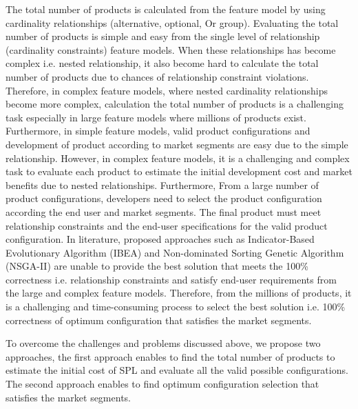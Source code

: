 The total number of products is calculated from the feature model by using cardinality relationships (alternative, optional, Or group). Evaluating the total number of products is simple and easy from the single level of relationship (cardinality constraints) feature models. When these relationships has become complex i.e. nested relationship, it also become hard to calculate the total number of products due to chances of relationship constraint violations. Therefore, in complex feature models, where nested cardinality relationships become more complex, calculation the total number of products is a challenging task especially in large feature models where millions of products exist. Furthermore, in simple feature models, valid product configurations and development of product according to market segments are easy due to the simple relationship. However, in complex feature models, it is a challenging and complex task to evaluate each product to estimate the initial development cost and market benefits due to nested relationships. Furthermore, From a large number of product configurations, developers need to select the product configuration according the end user and market segments. The final product must meet relationship constraints and the end-user specifications for the valid product configuration. In literature, proposed approaches such as Indicator-Based Evolutionary Algorithm (IBEA) \cite{t38} and Non-dominated Sorting Genetic Algorithm (NSGA-II) are unable to provide the best solution that meets the 100\% correctness i.e. relationship constraints and satisfy end-user requirements from the large and complex feature models. Therefore, from the millions of products, it is a challenging and time-consuming process to select the best solution i.e. 100\% correctness of optimum configuration that satisfies the market segments. 

To overcome the challenges and problems discussed above, we propose two approaches, the first approach enables to find the total number of products to estimate the initial cost of SPL and evaluate all the valid possible configurations. The second approach enables to find optimum configuration selection that satisfies the market segments.

